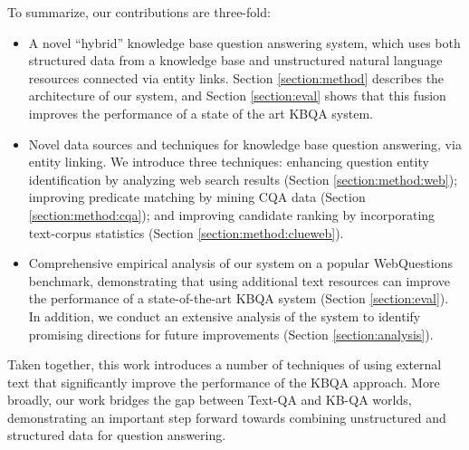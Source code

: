 To summarize, our contributions are three-fold:
\begin{itemize}
\item A novel ``hybrid'' knowledge base question answering system, which uses both structured data from a knowledge base and unstructured natural language resources connected via entity links. Section \ref{section:method} describes the architecture of our system, and Section \ref{section:eval} shows that this fusion improves the performance of a state of the art KBQA system.
\item Novel data sources and techniques for knowledge base question answering, via entity linking. We introduce three techniques: enhancing question entity identification by analyzing web search results (Section \ref{section:method:web}); improving predicate matching by mining CQA data (Section \ref{section:method:cqa}); and improving candidate ranking by incorporating text-corpus statistics (Section \ref{section:method:clueweb}).
\item Comprehensive empirical analysis of our system on a popular WebQuestions benchmark, demonstrating that using additional text resources can improve the performance of a state-of-the-art KBQA system (Section \ref{section:eval}). In addition, we conduct an extensive analysis of the system to identify promising directions for future improvements (Section \ref{section:analysis}).
\end{itemize}

Taken together, this work introduces a number of techniques of using external text that significantly improve the performance of the KBQA approach. More broadly, our work bridges the gap between Text-QA and KB-QA worlds, demonstrating an important step forward towards combining unstructured and structured data for question answering. 





